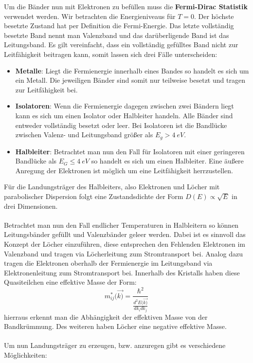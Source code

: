Um die Bänder nun mit Elektronen zu befüllen muss die \textbf{Fermi-Dirac Statistik} verwendet werden. Wir betrachten die Energieniveaus für $ T = 0$. Der höchste besetzte Zustand hat per Definition die Fermi-Energie. Das letzte vollständig besetzte Band nennt man Valenzband und das darüberligende Band ist das Leitungsband. Es gilt vereinfacht, dass ein vollständig gefülltes Band nicht zur Leitfähigkeit beitragen kann, somit lassen sich drei Fälle unterscheiden:
\begin{itemize}
    \item \textbf{Metalle}: Liegt die Fermienergie innerhalb eines Bandes so handelt es sich um ein Metall. Die jeweiligen Bänder sind somit nur teilweise besetzt und tragen zur Leitfähigkeit bei. \\
    \item \textbf{Isolatoren}: Wenn die Fermienergie dagegen zwischen zwei Bändern liegt kann es sich um einen Isolator oder Halbleiter handeln. Alle Bänder sind entweder vollständig besetzt oder leer. Bei Isolatoren ist die Bandlücke zwischen Valenz- und Leitungsband größer als $E_g > \SI{4}{eV}$. \\
    \item \textbf{Halbleiter}: Betrachtet man nun den Fall für Isolatoren mit einer geringeren Bandlücke als $E_G \leq \SI{4}{eV} $ so handelt es sich um einen Halbleiter. Eine äußere Anregung der Elektronen ist möglich um eine Leitfähigkeit herrzustellen.\\
\end{itemize}

Für die Landungsträger des Halbleiters, also Elektronen und Löcher mit parabolischer Dispersion folgt eine Zustandsdichte der Form $ D(E) \propto \sqrt{E}$ in drei Dimensionen. 
\\
\\
Betrachtet man nun den Fall endlicher Temperaturen in Halbleitern so können Leitungsbänder gefüllt und Valenzbänder geleer werden. Dabei ist es sinnvoll das Konzept der Löcher einzuführen, diese entsprechen den Fehlenden Elektronen im Valenzband und tragen via Löcherleitung zum Stromtransport bei. Analog dazu tragen die Elektronen oberhalb der Fermienergie im Leitungsband via Elektronenleitung zum Stromtransport bei. Innerhalb des Kristalls haben diese Quasiteilchen eine effektive Masse der Form:
\begin{equation}
    m^*_{ij}(\Vec{k)} = \frac{\hbar^2}{\frac{d^2E(\Vec{k)}}{dk_i dk_j}} 
\end{equation}
hierraus erkennt man die Abhängigkeit der effektiven Masse von der Bandkrümmung. Des weiteren haben Löcher eine negative effektive Masse. \\
\\
Um nun Landungsträger zu erzeugen, bzw. anzuregen gibt es verschiedene Möglichkeiten:

